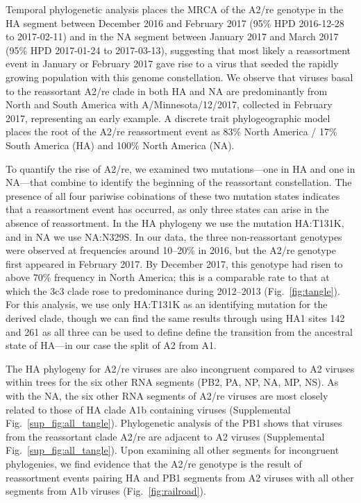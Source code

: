 Temporal phylogenetic analysis places the MRCA of the A2/re genotype in the HA segment between December 2016 and February 2017 (95\% HPD 2016-12-28 to 2017-02-11) and in the NA segment between January 2017 and March 2017 (95\% HPD 2017-01-24 to 2017-03-13), suggesting that most likely a reassortment event in January or February 2017 gave rise to a virus that seeded the rapidly growing population with this genome constellation.
We observe that viruses basal to the reassortant A2/re clade in both HA and NA are predominantly from North and South America with A/Minnesota/12/2017, collected in February 2017, representing an early example.
A discrete trait phylogeographic model places the root of the A2/re reassortment event as 83\% North America / 17\% South America (HA) and 100\% North America (NA).

To quantify the rise of A2/re, we examined two mutations---one in HA and one in NA---that combine to identify the beginning of the reassortant constellation.
The presence of all four pariwise cobinations of these two mutation states indicates that a reassortment event has occurred, as only three states can arise in the absence of reassortment.
In the HA phylogeny we use the mutation HA:T131K, and in NA we use NA:N329S.
In our data, the three non-reassortant genotypes were observed at frequencies around 10--20\% in 2016, but the A2/re genotype first appeared in February 2017.
By December 2017, this genotype had risen to above 70\% frequency in North America; this is a comparable rate to that at which the 3c3 clade rose to predominance during 2012--2013 (Fig.~\ref{fig:tangle}).
For this analysis, we use only HA:T131K as an identifying mutation for the derived clade, though we can find the same results through using HA1 sites 142 and 261 as all three can be used to define define the transition from the ancestral state of HA---in our case the split of A2 from A1.

The HA phylogeny for A2/re viruses are also incongruent compared to A2 viruses within trees for the six other RNA segments (PB2, PA, NP, NA, MP, NS).
As with the NA, the six other RNA segments of A2/re viruses are most closely related to those of HA clade A1b containing viruses (Supplemental Fig.~\ref{sup_fig:all_tangle}).
Phylogenetic analysis of the PB1 shows that viruses from the reassortant clade A2/re are adjacent to A2 viruses (Supplemental Fig.~\ref{sup_fig:all_tangle}).
Upon examining all other segments for incongruent phylogenies, we find evidence that the A2/re genotype is the result of reassortment events pairing HA and PB1 segments from A2 viruses with all other segments from A1b viruses (Fig.~\ref{fig:railroad}).

